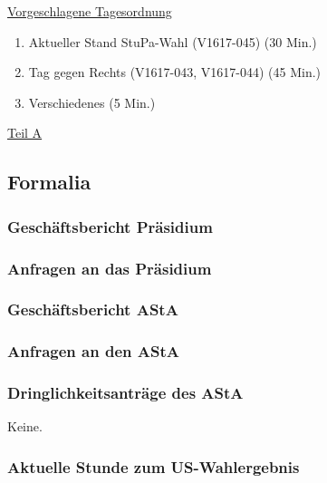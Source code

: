\documentclass[ngerman,headheight=70pt]{scrartcl}
\begin{document}
    \newpage
    \underline{Vorgeschlagene Tagesordnung}
    \begin{enumerate}[label={\textbf{Top \theenumi}},leftmargin=*]
        \item Aktueller Stand StuPa-Wahl (V1617-045) (30 Min.)
        \item Tag gegen Rechts (V1617-043, V1617-044) (45 Min.)
        \item Verschiedenes (5 Min.)
    \end{enumerate}

    \newpage


    {\Large \underline{Teil A}}

    \subsection{Formalia}


    \subsubsection{Geschäftsbericht Präsidium}


    \subsubsection{Anfragen an das Präsidium}


    \subsubsection{Geschäftsbericht AStA}



    \subsubsection{Anfragen an den AStA}


    \subsubsection{Dringlichkeitsanträge des AStA}

    Keine.

    \subsubsection{Aktuelle Stunde zum US-Wahlergebnis}
\end{document}

